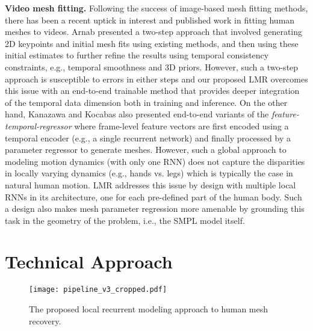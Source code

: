 \documentclass[10pt,twocolumn,letterpaper]{article}
\begin{document}
\indent \textbf{Video mesh fitting.} Following the success of image-based mesh fitting methods, there has been a recent uptick in interest and published work in fitting human meshes to videos. Arnab \etal \cite{Arnab_2019_CVPR} presented a two-step approach that involved generating 2D keypoints and initial mesh fits using existing methods, and then using these initial estimates to further refine the results using temporal consistency constraints, e.g., temporal smoothness and 3D priors. However, such a two-step approach is susceptible to errors in either steps and our proposed LMR overcomes this issue with an end-to-end trainable method that provides deeper integration of the temporal data dimension both in training and inference. On the other hand, Kanazawa \etal \cite{humanMotionKanazawa19} and Kocabas \etal \cite{kocabas2019vibe} also presented end-to-end variants of the \textsl{feature-temporal-regressor} where frame-level feature vectors are first encoded using a temporal encoder (e.g., a single recurrent network) and finally processed by a parameter regressor to generate meshes. However, such a global approach to modeling motion dynamics (with only one RNN) does not capture the disparities in locally varying dynamics (e.g., hands vs. legs) which is typically the case in natural human motion. LMR addresses this issue by design with multiple local RNNs in its architecture, one for each pre-defined part of the human body. Such a design also makes mesh parameter regression more amenable by grounding this task in the geometry of the problem, i.e., the SMPL model itself. 



\section{Technical Approach}

\begin{figure*}[h!]
\centering
\texttt{[image: pipeline\_v3\_cropped.pdf]}
\caption{The proposed local recurrent modeling approach to human mesh recovery.}
\label{fig:pipeline}
\end{figure*}
\end{document}
